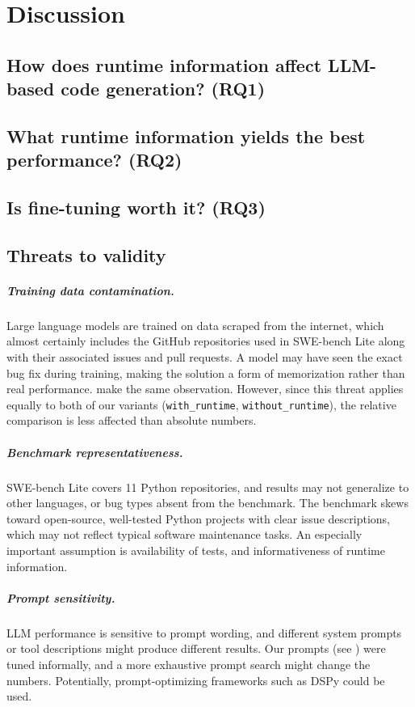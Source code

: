 \chapter{Discussion}
\label{ch:discussion}

\section{How does runtime information affect LLM-based code generation? (RQ1)}
\section{What runtime information yields the best performance? (RQ2)}
\section{Is fine-tuning worth it? (RQ3)}
\section{Threats to validity}

\paragraph{Training data contamination.}
Large language models are trained on data scraped from the internet, which almost certainly includes the GitHub repositories used in SWE-bench Lite along with their associated issues and pull requests.
A model may have seen the exact bug fix during training, making the solution a form of memorization rather than real performance.
\citep{xia2024agentless} make the same observation. However, since this threat applies equally to both of our variants (\texttt{with\_runtime}, \texttt{without\_runtime}), the relative comparison is less affected than absolute numbers.

\paragraph{Benchmark representativeness.}
SWE-bench Lite covers 11 Python repositories, and results may not generalize to other languages, or bug types absent from the benchmark.
The benchmark skews toward open-source, well-tested Python projects with clear issue descriptions, which may not reflect typical software maintenance tasks. An especially important assumption is availability of tests, and informativeness of runtime information.

\paragraph{Prompt sensitivity.}
LLM performance is sensitive to prompt wording, and different system prompts or tool descriptions might produce different results.
Our prompts (see ) were tuned informally, and a more exhaustive prompt search might change the numbers. Potentially, prompt-optimizing frameworks such as DSPy \citep{khattab2023dspy} could be used.


